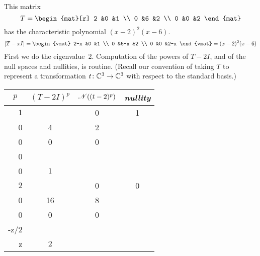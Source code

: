 \begin{example} \label{ex:FirstJordForm}
This matrix 
\begin{equation*}
   T=
   \begin{mat}[r]
     2  &0  &1  \\
     0  &6  &2  \\
     0  &0  &2
   \end{mat}
\end{equation*}
has the characteristic polynomial \( (x-2)^2(x-6) \).
\begin{equation*}
   |T-xI|=
   \begin{vmat}
     2-x  &0    &1  \\
     0    &6-x  &2  \\
     0    &0    &2-x
   \end{vmat}
   =(x-2)^2(x-6)
\end{equation*}
First we do the eigenvalue~$2$.
Computation of the powers of $T-2I$, and of the null spaces and nullities, 
is routine.
(Recall our convention
of taking $T$ to represent a transformation $\mbox{$t\colon \mathbb{C}^3\to \mathbb{C}^3$}$
with respect to the standard basis.)
\begin{center}
  \renewcommand{\arraystretch}{1.25}
  \begin{tabular}{r|ccc} 
    \multicolumn{1}{c}{\( p \)}  
         &\( (T-2I)^p \) &\( \mathscr{N}((t-2)^p)  \) 
         &\textit{nullity}                                            \\  
    \hline
    \( 1 \)
    &\matrixvenlarge{\begin{mat}[r]
          0  &0  &1  \\
          0  &4  &2  \\
          0  &0  &0
        \end{mat}}
    &\( \set{\matrixvenlarge{\colvec{x \\ 0 \\ 0}}
         \suchthat x\in\C}  \)  
    &$1$                                                   \\
    \( 2 \)
    &\matrixvenlarge{\begin{mat}[r]
          0  &0  &0  \\
          0  &16 &8  \\
          0  &0  &0
        \end{mat}}
    &\( \set{\matrixvenlarge{\colvec{x \\ -z/2 \\  z}}
               \suchthat x,z\in\C}  \) 
    &$2$                                                   \\

\end{tabular}
\end{center}
\end{example}
